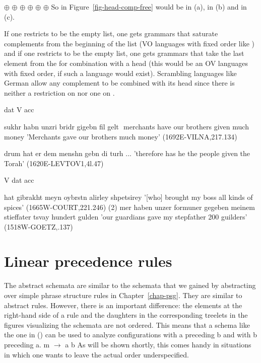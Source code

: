 \eal
\ex \eliste{} $\oplus$  $\oplus$  
\ex {} $\oplus$  $\oplus$  
\ex {} $\oplus$  $\oplus$ \eliste 
\zl
So  in Figure~\ref{fig-head-comp-free} would be \npnom in (a), \npdat in (b) and \npacc in (c).

If one restricts  to be the
empty list, one gets grammars that saturate complements from the beginning of the list (VO languages
with fixed order like ) and if one restricts  to be the empty list, one gets grammars that take the last
element from the \compsl for combination with a head (this would be an OV languages with fixed
order, if such a language would exist). Scrambling languages like German allow any
complement to be combined with its head since there is neither a restriction on  nor one on .




dat V acc

sukhr habn unzri bridr gigebn fil gelt  
merchants have our brothers given much money
'Merchants gave our brothers much money'
(1692E-VILNA,217.134)

drum hat er dem menshn gebn di turh ... 
'therefore has he the people given the Torah'
(1620E-LEVTOV1,4l.47)


V dat acc

hat gibrakht meyn oybrstn alirley shpetsirey '[who] brought my boss all kinds of spices'
(1665W-COURT,221.246)
(2) mer haben unzer formuner gegeben meinem stieffater tsvay hundert gulden
'our guardians gave my stepfather 200 guilders' (1518W-GOETZ,.137)


\fi


\section{Linear precedence rules}
\label{sec-lp-rules}

The abstract schemata are similar to the schemata that we gained by abstracting over simple phrase
structure rules in Chapter~\ref{chap-psg}. They are similar to abstract \xbar rules. However, there
is an important difference: the elements at the right-hand side of a rule and the daughters in the
corresponding treelets in the figures visualizing the schemata are not ordered. This means that a
schema like the one in () can be used to analyze configurations with a preceding b and with
b preceding a.
\ea
m $\to$ a b
\z
As will be shown shortly, this comes handy in situations in which one wants to leave the actual
order underspecified.

